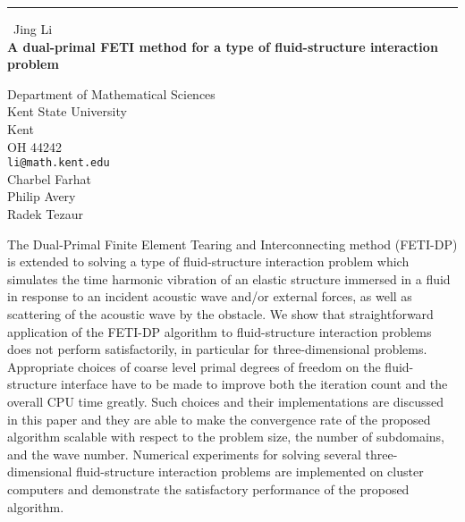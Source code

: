 \documentclass{report}
\begin{document}
\begin{center}
\rule{6in}{1pt} \
{\large Jing Li \\
{\bf A dual-primal FETI method for a type of fluid-structure interaction problem }}

Department of Mathematical Sciences \\ Kent State University \\ Kent \\ OH 44242
\\
{\tt li@math.kent.edu}\\
Charbel  Farhat \\
Philip  Avery \\
	Radek Tezaur\end{center}

The Dual-Primal Finite Element Tearing and Interconnecting method
(FETI-DP) is extended to solving a type of fluid-structure interaction
problem which simulates the time harmonic vibration of an elastic
structure immersed in a fluid in response to an incident acoustic wave
and/or external forces, as well as scattering of the acoustic wave by the
obstacle. We show that straightforward application of the FETI-DP
algorithm to fluid-structure interaction problems does not perform
satisfactorily, in particular for three-dimensional problems. Appropriate
choices of coarse level primal degrees of freedom on the fluid-structure
interface have to be made to improve both the iteration count and the
overall CPU time greatly. Such choices and their implementations are
discussed in this paper and they are able to make the convergence rate of
the proposed algorithm scalable with respect to the problem size, the
number of subdomains, and the wave number. Numerical experiments for
solving several three-dimensional fluid-structure interaction problems
are implemented on cluster computers and demonstrate the satisfactory
performance of the proposed algorithm.
\end{document}
